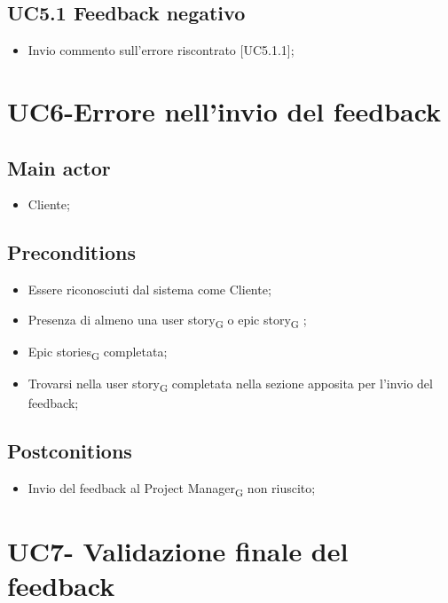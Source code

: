 \documentclass{article}
\begin{document}
    \subsection{UC5.1 Feedback negativo}
    \begin{itemize}
            \item Invio commento sull'errore riscontrato [UC5.1.1];
        \end{itemize}
        
\section{UC6-Errore nell'invio del feedback}

     \subsection*{Main actor}
     \begin{itemize}
         \item Cliente;
     \end{itemize}
     \subsection*{Preconditions} 
 \begin{itemize}
        \item Essere riconosciuti dal sistema come Cliente;
        \item Presenza di almeno una user story\textsubscript{G}  o epic story\textsubscript{G} ;
        \item Epic stories\textsubscript{G}  completata;
        \item Trovarsi nella user story\textsubscript{G}  completata nella sezione apposita per l'invio del feedback;
    \end{itemize}
     \subsection*{Postconitions} 
        \begin{itemize}
            \item Invio del feedback al Project Manager\textsubscript{G}  non riuscito;
        \end{itemize} 

        
\section{UC7- Validazione finale del feedback}
\end{document}
